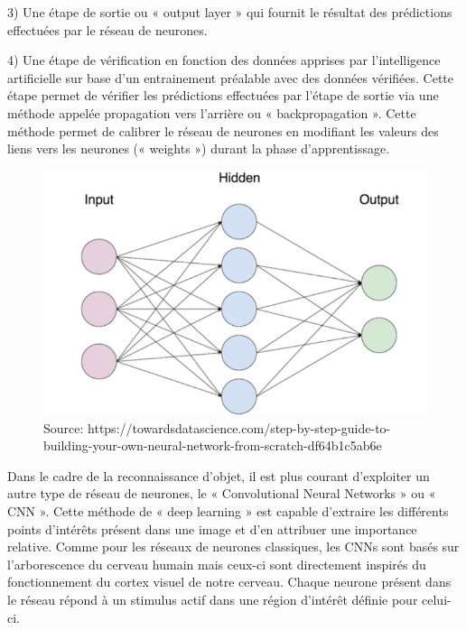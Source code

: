 \documentclass[a4paper,12pt]{article} %
\begin{document}
3)	Une étape de sortie ou « output layer » qui fournit le résultat des prédictions effectuées par le réseau de neurones. \newline

4)	Une étape de vérification en fonction des données apprises par l’intelligence artificielle sur base d’un entrainement préalable avec des données vérifiées. Cette étape permet de vérifier les prédictions effectuées par l’étape de sortie via une méthode appelée propagation vers l’arrière ou « backpropagation ». Cette méthode permet de calibrer le réseau de neurones en modifiant les valeurs des liens vers les neurones (« weights ») durant la phase d’apprentissage. \newline
\begin{figure}[h] %
  \centering %
  \includegraphics[scale=0.30]{ANN.png} %
  \caption{Source: https://towardsdatascience.com/step-by-step-guide-to-building-your-own-neural-network-from-scratch-df64b1c5ab6e} %
\end{figure}
\newpage
\par
Dans le cadre de la reconnaissance d’objet, il est plus courant d’exploiter un autre type de réseau de neurones, le « Convolutional Neural Networks » ou « CNN ». Cette méthode de « deep learning » est capable d’extraire les différents points d’intérêts présent dans une image et d’en attribuer une importance relative. 
Comme pour les réseaux de neurones classiques, les CNNs sont basés sur l’arborescence du cerveau humain mais ceux-ci sont directement inspirés du fonctionnement du cortex visuel de notre cerveau. Chaque neurone présent dans le réseau répond à un stimulus actif dans une région d’intérêt définie pour celui-ci. \newline
\end{document}
